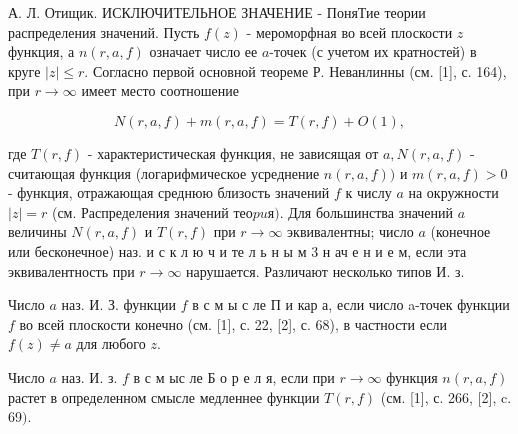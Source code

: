 \documentclass[10pt]{article}
\begin{document}
А. Л. Отищик. ИСКЛЮЧИТЕЛЬНОЕ ЗНАЧЕНИЕ - ПоняТие теории распределения значений. Пусть $f(z)$ - мероморфная во всей плоскости $z$ функция, а $n(r, a, f)$ означает число ее $a$-точек (с учетом их кратностей) в круге $|z| \leqslant r$. Согласно первой основной теореме Р. Неванлинны (см. [1], с. 164), при $r \rightarrow \infty$ имеет место соотношение



\[

N(r, a, f)+m(r, a, f)=T(r, f)+O(1),

\]



где $T(r, f)$ - характеристическая функция, не зависящая от $a, N(r, a, f)$ - считающая функция (логарифмическое усреднение $n(r, a, f))$ и $m(r, a, f)>0$ - функция, отражающая среднюю близость значений $f$ к числу $a$ на окружности $|z|=r$ (см. Распределения значений тео$p u я)$. Для большинства значений $a$ величины $N(r, a, f)$ и $T(r, f)$ при $r \rightarrow \infty$ эквивалентны; число $a$ (конечное или бесконечное) наз. и с к л ю ч и те л ь н ы м 3 н ач е н и е м, если эта эквивалентность при $r \rightarrow \infty$ нарушается. Различают несколько типов И. з.



Число $a$ наз. И. З. функции $f$ в с м ы с ле П и кар а, если число a-точек функции $f$ во всей плоскости конечно (см. [1], с. 22, [2], с. 68), в частности если $f(z) \neq a$ для любого $z$.



Число $a$ наз. И. з. $f$ в с м ыс ле Б о р е л я, если при $r \rightarrow \infty$ функция $n(r, a, f)$ растет в определенном смысле медленнее функции $T(r, f)$ (см. [1], с. 266, [2], c. 69$)$.
\end{document}
